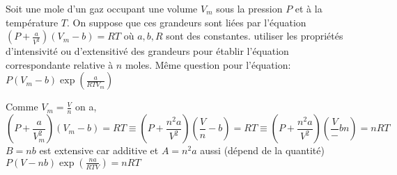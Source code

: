 \begin{Exercise}[title=Grandeur intensive et extensive]
		Soit une mole d’un gaz occupant une volume $V_m$ sous la pression $P$ et à la température $T$.
		\Question On suppose que ces grandeurs sont liées par l'équation $\left(P+\frac{a}{V^2}\right)(V_m-b) =RT$ où $a,b,R$ sont des constantes. utiliser les propriétés d'intensivité ou d'extensitivé des grandeurs pour établir l'équation correspondante relative à $n$ moles.
		\Question Même question pour l'équation: $P(V_m-b)\exp\left(\frac{a}{RTV_m}\right)$
\end{Exercise}
\begin{Answer}
  \Question Comme $V_m = \frac{V}{n}$ on a,
  \[\left(P+\frac{a}{V_m^2}\right)(V_m-b)=RT \equiv \left(P+\frac{n^2a}{V^2}\right)\left(\frac{V}{n}-b\right) = RT \equiv\left(P+\frac{n^2a}{V^2}\right)\left(\frac{V}-bn\right) = nRT\]
  $B=nb$ est extensive car additive et $A=n^2a$ aussi (dépend de la quantité)
  \Question $P(V-nb)\exp\left(\frac{na}{RTV}\right)=nRT$
\end{Answer}
